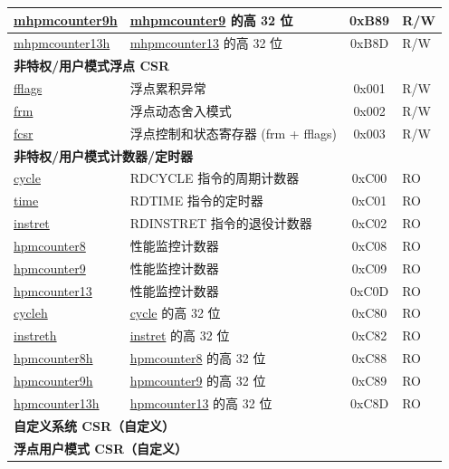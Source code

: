 \begin{longtable}{ | p{4.0cm} | p{8.4cm} | c | l | }
\hyperref[regdesc:MHPMCOUNTER9H]{mhpmcounter9h} & \hyperref[regdesc:MHPMCOUNTER9]{mhpmcounter9} 的高 32 位 & 0xB89 & R/W \\\hline
\hyperref[regdesc:MHPMCOUNTER13H]{mhpmcounter13h} & \hyperref[regdesc:MHPMCOUNTER13]{mhpmcounter13} 的高 32 位 & 0xB8D & R/W \\\hline
\multicolumn{4}{|l|}{\textbf{非特权/用户模式浮点 CSR}} \\\hline
\hyperref[regdesc:FFLAGS]{fflags} & 浮点累积异常 & 0x001 & R/W \\\hline
\hyperref[regdesc:FRM]{frm} & 浮点动态舍入模式 & 0x002 & R/W \\\hline
\hyperref[regdesc:FCSR]{fcsr} & 浮点控制和状态寄存器 (frm + fflags) & 0x003 & R/W \\\hline
\multicolumn{4}{|l|}{\textbf{非特权/用户模式计数器/定时器}} \\\hline
\hyperref[regdesc:CYCLE]{cycle} & RDCYCLE 指令的周期计数器 & 0xC00 & RO\\\hline
\hyperref[regdesc:TIME]{time} & RDTIME 指令的定时器 & 0xC01 & RO \\\hline
\hyperref[regdesc:INSTRET]{instret} & RDINSTRET 指令的退役计数器 & 0xC02 & RO \\\hline
\hyperref[regdesc:HPMCOUNTER8]{hpmcounter8} & 性能监控计数器 & 0xC08 & RO \\\hline
\hyperref[regdesc:HPMCOUNTER9]{hpmcounter9} & 性能监控计数器 & 0xC09 & RO \\\hline
\hyperref[regdesc:HPMCOUNTER13]{hpmcounter13} & 性能监控计数器 & 0xC0D & RO \\\hline
\hyperref[regdesc:CYCLEH]{cycleh} & \hyperref[regdesc:CYCLE]{cycle} 的高 32 位 & 0xC80 & RO \\\hline
\hyperref[regdesc:INSTRETH]{instreth} & \hyperref[regdesc:INSTRET]{instret} 的高 32 位 & 0xC82 & RO \\\hline
\hyperref[regdesc:HPMCOUNTER8H]{hpmcounter8h} & \hyperref[regdesc:HPMCOUNTER8]{hpmcounter8} 的高 32 位 & 0xC88 & RO \\\hline
\hyperref[regdesc:HPMCOUNTER9H]{hpmcounter9h} & \hyperref[regdesc:HPMCOUNTER9]{hpmcounter9} 的高 32 位 & 0xC89 & RO \\\hline
\hyperref[regdesc:HPMCOUNTER13H]{hpmcounter13h} & \hyperref[regdesc:HPMCOUNTER13]{hpmcounter13} 的高 32 位 & 0xC8D & RO \\\hline
\multicolumn{4}{|l|}{\textbf{自定义系统 CSR（自定义）}} \\\hline
\multicolumn{4}{|l|}{\textbf{浮点用户模式 CSR（自定义）}} \\\hline

\end{longtable}

